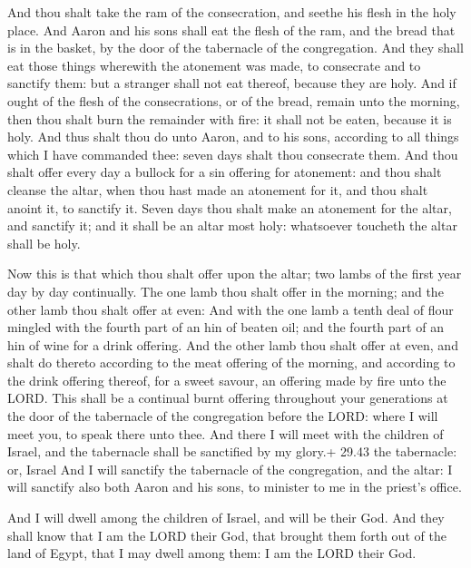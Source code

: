  And thou shalt take the ram of the consecration, and
seethe his flesh in the holy place.  And Aaron and his sons
shall eat the flesh of the ram, and the bread that is in the basket, by
the door of the tabernacle of the congregation.  And they
shall eat those things wherewith the atonement was made, to consecrate
and to sanctify them: but a stranger shall not eat thereof, because they
are holy.  And if ought of the flesh of the consecrations,
or of the bread, remain unto the morning, then thou shalt burn the
remainder with fire: it shall not be eaten, because it is holy.
 And thus shalt thou do unto Aaron, and to his sons,
according to all things which I have commanded thee: seven days shalt
thou consecrate them.  And thou shalt offer every day a
bullock for a sin offering for atonement: and thou shalt cleanse the
altar, when thou hast made an atonement for it, and thou shalt anoint
it, to sanctify it.  Seven days thou shalt make an
atonement for the altar, and sanctify it; and it shall be an altar most
holy: whatsoever toucheth the altar shall be holy.

 Now this is that which thou shalt offer upon the altar;
two lambs of the first year day by day continually.  The
one lamb thou shalt offer in the morning; and the other lamb thou shalt
offer at even:  And with the one lamb a tenth deal of flour
mingled with the fourth part of an hin of beaten oil; and the fourth
part of an hin of wine for a drink offering.  And the other
lamb thou shalt offer at even, and shalt do thereto according to the
meat offering of the morning, and according to the drink offering
thereof, for a sweet savour, an offering made by fire unto the LORD.
 This shall be a continual burnt offering throughout your
generations at the door of the tabernacle of the congregation before the
LORD: where I will meet you, to speak there unto thee.  And
there I will meet with the children of Israel, and the tabernacle shall
be sanctified by my glory.+ 29.43 the tabernacle: or, Israel
 And I will sanctify the tabernacle of the congregation,
and the altar: I will sanctify also both Aaron and his sons, to minister
to me in the priest's office.

 And I will dwell among the children of Israel, and will
be their God.  And they shall know that I am the LORD their
God, that brought them forth out of the land of Egypt, that I may dwell
among them: I am the LORD their God.

